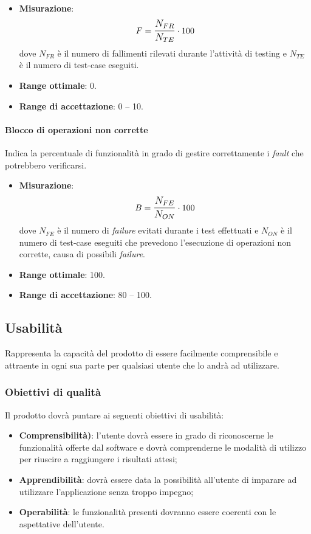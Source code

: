 \begin{itemize}
	\item \textbf{Misurazione}: 
		$$F=\mathlarger{\frac{N_{FR}}{N_{TE}}} \cdot 100$$
	dove $N_{FR}$ è il numero di fallimenti rilevati durante l'attività di testing e $N_{TE}$ è il numero di test-case eseguiti.
	\item \textbf{Range ottimale}: 0.
	\item \textbf{Range di accettazione}: 0 -- 10.
\end{itemize}

\paragraph{Blocco di operazioni non corrette}
Indica la percentuale di funzionalità in grado di gestire correttamente i \textit{fault} che potrebbero verificarsi.
\begin{itemize}
	\item \textbf{Misurazione}: 
		$$B=\mathlarger{\frac{N_{FE}}{N_{ON}}} \cdot 100$$
	dove $N_{FE}$ è il numero di \textit{failure} evitati durante i test effettuati e $N_{ON}$ è il numero di test-case eseguiti che prevedono l'esecuzione di operazioni non corrette, causa di possibili \textit{failure}.
	\item \textbf{Range ottimale}: 100.
	\item \textbf{Range di accettazione}: 80 -- 100.
\end{itemize}

\subsection{Usabilità}
Rappresenta la capacità del prodotto di essere facilmente comprensibile e attraente in ogni sua parte per qualsiasi utente che lo andrà ad utilizzare.

\subsubsection{Obiettivi di qualità}
Il prodotto dovrà puntare ai seguenti obiettivi di usabilità:
\begin{itemize}
\item \textbf{Comprensibilità)}: l'utente dovrà essere in grado di riconoscerne le funzionalità offerte dal software e dovrà comprenderne le modalità di utilizzo per riuscire a raggiungere i risultati attesi;
\item \textbf{Apprendibilità}: dovrà essere data la possibilità all'utente di imparare ad utilizzare l'applicazione senza troppo impegno;
\item \textbf{Operabilità}: le funzionalità presenti dovranno essere coerenti con le aspettative dell'utente.
\end{itemize}

